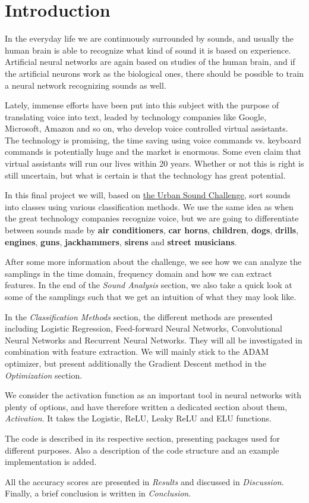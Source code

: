 \section{Introduction} \label{sec:introduction}
In the everyday life we are continuously surrounded by sounds, and usually the human brain is able to recognize what kind of sound it is based on experience. Artificial neural networks are again based on studies of the human brain, and if the artificial neurons work as the biological ones, there should be possible to train a neural network recognizing sounds as well. 

Lately, immense efforts have been put into this subject with the purpose of translating voice into text, leaded by technology companies like Google, Microsoft, Amazon and so on, who develop voice controlled virtual assistants. The technology is promising, the time saving using voice commands vs. keyboard commands is potentially huge and the market is enormous. Some even claim that virtual assistants will run our lives within 20 years. \cite{Feloni} Whether or not this is right is still uncertain, but what is certain is that the technology has great potential.

In this final project we will, based on \href{https://datahack.analyticsvidhya.com/contest/practice-problem-urban-sound-classification/}{the Urban Sound Challenge}, sort sounds into classes using various classification methods. We use the same idea as when the great technology companies recognize voice, but we are going to differentiate between sounds made by \textbf{air conditioners}, \textbf{car horns}, \textbf{children}, \textbf{dogs}, \textbf{drills}, \textbf{engines}, \textbf{guns}, \textbf{jackhammers}, \textbf{sirens} and \textbf{street musicians}. 

After some more information about the challenge, we see how we can analyze the samplings in the time domain, frequency domain and how we can extract features. In the end of the \textit{Sound Analysis} section, we also take a quick look at some of the samplings such that we get an intuition of what they may look like.

In the \textit{Classification Methods} section, the different methods are presented including Logistic Regression, Feed-forward Neural Networks, Convolutional Neural Networks and Recurrent Neural Networks. They will all be investigated in combination with feature extraction. We will mainly stick to the ADAM optimizer, but present additionally the Gradient Descent method in the \textit{Optimization} section. 

We consider the activation function as an important tool in neural networks with plenty of options, and have therefore written a dedicated section about them, \textit{Activation}. It takes the Logistic, ReLU, Leaky ReLU and ELU functions. 

The code is described in its respective section, presenting packages used for different purposes. Also a description of the code structure and an example implementation is added. 

All the accuracy scores are presented in \textit{Results} and discussed in \textit{Discussion}. Finally, a brief conclusion is written in \textit{Conclusion}.

